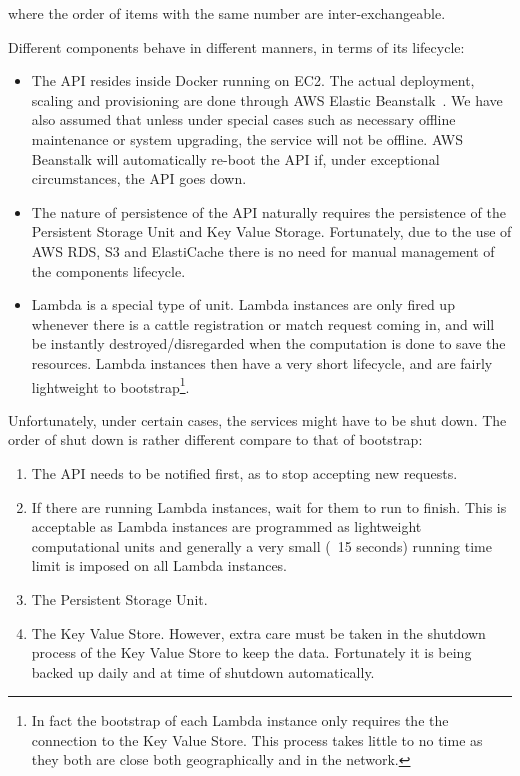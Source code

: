 where the order of items with the same number are inter-exchangeable.

Different components behave in different manners, in terms of its lifecycle:

\begin{itemize}
	\item The API resides inside Docker running on EC2. The actual deployment, scaling and provisioning are done through AWS Elastic Beanstalk~\cite{beanstalk}. We have also assumed that unless under special cases such as necessary offline maintenance or system upgrading, the service will not be offline. AWS Beanstalk will automatically re-boot the API if, under exceptional circumstances, the API goes down.
	\item The nature of persistence of the API naturally requires the persistence of the Persistent Storage Unit and Key Value Storage. Fortunately, due to the use of AWS RDS, S3 and ElastiCache there is no need for manual management of the components lifecycle.
	\item Lambda is a special type of unit. Lambda instances are only fired up whenever there is a cattle registration or match request coming in, and will be instantly destroyed/disregarded when the computation is done to save the resources. Lambda instances then have a very short lifecycle, and are fairly lightweight to bootstrap\footnote{In fact the bootstrap of each Lambda instance only requires the the connection to the Key Value Store. This process takes little to no time as they both are close both geographically and in the network.}.
\end{itemize}

Unfortunately, under certain cases, the services might have to be shut down. The order of shut down is rather different compare to that of bootstrap:

\begin{enumerate}
	\item The API needs to be notified first, as to stop accepting new requests.
	\item If there are running Lambda instances, wait for them to run to finish. This is acceptable as Lambda instances are programmed as lightweight computational units and generally a very small (~15 seconds) running time limit is imposed on all Lambda instances.
	\item The Persistent Storage Unit.
	\item The Key Value Store. However, extra care must be taken in the shutdown process of the Key Value Store to keep the data. Fortunately it is being backed up daily and at time of shutdown automatically.
\end{enumerate}

